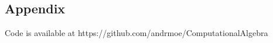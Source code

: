 \documentclass[12pt,a4paper]{article}
\begin{document}
\newpage
\begin{appendix}
\section*{Appendix}
    Code is available at https://github.com/andrmoe/ComputationalAlgebra
    
    
\end{appendix}
\end{document}
